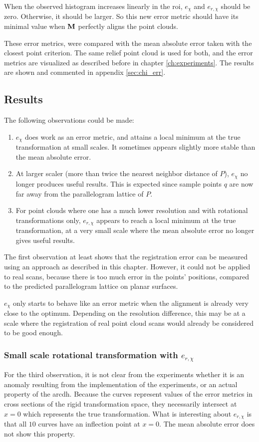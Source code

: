 When the observed histogram increases linearly in the \gls{roi}, $e_{\chi}$ and $e_{r,\chi}$ should be zero. Otherwise, it should be larger. So this new error metric should have its minimal value when $\mathbf{M}$ perfectly aligns the point clouds.

These error metrics, were compared with the mean absolute error taken with the closest point criterion. The same relief point cloud is used for both, and the error metrics are visualized as described before in chapter \ref{ch:experiments}. The results are shown and commented in appendix \ref{sec:chi_err}.

\FloatBarrier


\subsection{Results}
The following observations could be made:
\begin{enumerate}
\item $e_{\chi}$ does work as an error metric, and attains a local minimum at the true transformation at small scales. It sometimes appears slightly more stable than the mean absolute error.
\item At larger scaler (more than twice the nearest neighbor distance of $P$), $e_{\chi}$ no longer produces useful results. This is expected since sample points $q$ are now far away from the parallelogram lattice of $P$.
\item For point clouds where one has a much lower resolution and with rotational transformations only, $e_{r,\chi}$ appears to reach a local minimum at the true transformation, at a very small scale where the mean absolute error no longer gives useful results.
\end{enumerate}

The first observation at least shows that the registration error can be measured using an approach as described in this chapter. However, it could not be applied to real scans, because there is too much error in the points' positions, compared to the predicted parallelogram lattice on planar surfaces. 

$e_{\chi}$ only starts to behave like an error metric when the alignment is already very close to the optimum. Depending on the resolution difference, this may be at a scale where the registration of real point cloud scans would already be considered to be good enough.

\subsubsection{Small scale rotational transformation with $e_{r,\chi}$}
For the third observation, it is not clear from the experiments whether it is an anomaly resulting from the implementation of the experiments, or an actual property of the \gls{arcdh}. Because the curves represent values of the error metrics in cross sections of the rigid transformation space, they necessarily intersect at $x = 0$ which represents the true transformation. What is interesting about $e_{r,\chi}$ is that all $10$ curves have an inflection point at $x = 0$. The mean absolute error does not show this property.

